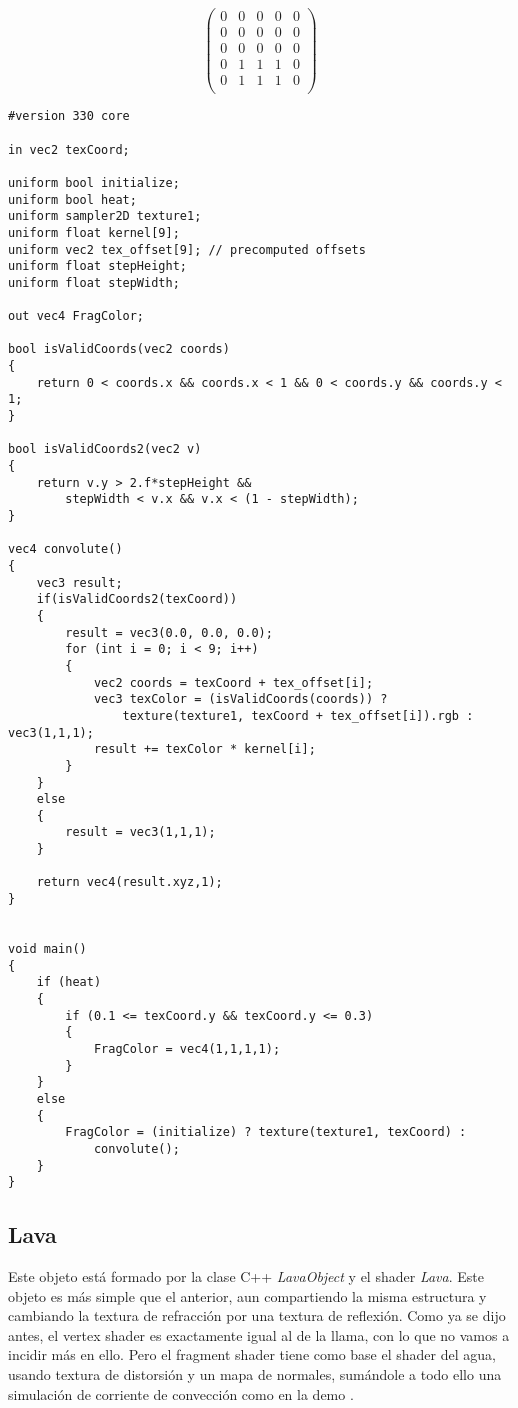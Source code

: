 \documentclass[12pt]{article}%
\begin{document}
\begin{equation}
	\begin{pmatrix}
		0 & 0 & 0 & 0 & 0 \\
		0 & 0 & 0 & 0 & 0 \\
		0 & 0 & 0 & 0 & 0 \\
		0 & 1 & 1 & 1 & 0 \\
		0 & 1 & 1 & 1 & 0 \\
	\end{pmatrix}
	\label{conv-matrix}
\end{equation}

\begin{lstlisting}[style=glsl]
#version 330 core

in vec2 texCoord;

uniform bool initialize;
uniform bool heat;
uniform sampler2D texture1;
uniform float kernel[9];
uniform vec2 tex_offset[9]; // precomputed offsets
uniform float stepHeight;
uniform float stepWidth;

out vec4 FragColor;

bool isValidCoords(vec2 coords)
{
	return 0 < coords.x && coords.x < 1 && 0 < coords.y && coords.y < 1;
}

bool isValidCoords2(vec2 v)
{
	return v.y > 2.f*stepHeight &&
		stepWidth < v.x && v.x < (1 - stepWidth);
}

vec4 convolute()
{
	vec3 result;
	if(isValidCoords2(texCoord))
	{
		result = vec3(0.0, 0.0, 0.0);
		for (int i = 0; i < 9; i++)
		{
			vec2 coords = texCoord + tex_offset[i];
			vec3 texColor = (isValidCoords(coords)) ?
				texture(texture1, texCoord + tex_offset[i]).rgb : vec3(1,1,1);
			result += texColor * kernel[i];
		}
	}
	else
	{
		result = vec3(1,1,1);
	}

	return vec4(result.xyz,1);
}


void main()
{
	if (heat)
	{
		if (0.1 <= texCoord.y && texCoord.y <= 0.3)
		{
			FragColor = vec4(1,1,1,1);
		}
	}
	else
	{
		FragColor = (initialize) ? texture(texture1, texCoord) :
			convolute();
	}
}
\end{lstlisting}
	
\subsection{Lava}

	Este objeto está formado por la clase C++ \textit{LavaObject} y el shader \textit{Lava}. Este objeto es más simple que el anterior, aun compartiendo la misma estructura y cambiando la textura de refracción por una textura de reflexión. Como ya se dijo antes, el vertex shader es exactamente igual al de la llama, con lo que no vamos a incidir más en ello. Pero el fragment shader tiene como base el shader del agua, usando textura de distorsión y un mapa de normales, sumándole a todo ello una simulación de corriente de convección como en la demo \cite{shader-lava}.
	
\end{document}
